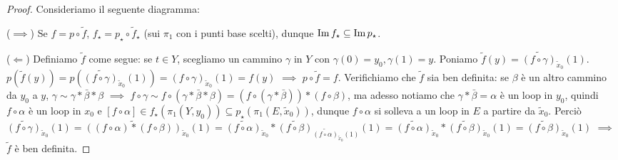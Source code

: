 \begin{proof}
  Consideriamo il seguente diagramma:
  \begin{center}
  \end{center}
  ($\implies$) Se $f=p \circ \tilde{f}$, $f_{\star}=p_{\star} \circ \tilde{f}_{\star}$ (sui $\pi_1$ con i punti base scelti), dunque $\operatorname{Im}{f_{\star}} \subseteq \operatorname{Im}{p_{\star}}$.

  ($\Leftarrow$) Definiamo $\tilde{f}$ come segue: se $t \in Y$, scegliamo un cammino $\gamma$ in $Y$ con $\gamma(0)=y_0, \gamma(1)=y$. Poniamo $\tilde{f}(y)=\widetilde{(f \circ \gamma)}_{\tilde{x}_0}(1)$.
  $p(\tilde{f}(y))=p(\widetilde{(f \circ \gamma)}_{\tilde{x}_0}(1))=(f \circ \gamma)_{\tilde{x}_0}(1)=f(y)$ $\implies$ $p \circ \tilde{f}=f$.
  Verifichiamo che $\tilde{f}$ sia ben definita: se $\beta$ è un altro cammino da $y_0$ a $y$, $\gamma \sim \gamma * \bar{\beta}*\beta$ $\implies$ $f \circ \gamma \sim f \circ (\gamma * \bar{\beta}*\beta)=(f \circ (\gamma * \bar{\beta}))*(f \circ \beta)$,
  ma adesso notiamo che $\gamma *\bar{\beta}=\alpha$ è un loop in $y_0$, quindi $f \circ \alpha$ è un loop in $x_0$ e $[f \circ \alpha] \in f_{\star}(\pi_1(Y, y_0)) \subseteq p_{\star}(\pi_1(E, \tilde{x}_0))$, dunque $f \circ \alpha$ si solleva a un loop in $E$ a partire da $\tilde{x}_0$.
  Perciò $\widetilde{(f \circ \gamma)}_{\tilde{x}_0}(1)=\widetilde{((f \circ \alpha)*(f \circ \beta))}_{\tilde{x}_0}(1)=\widetilde{(f \circ \alpha)}_{\tilde{x}_0}*\widetilde{(f \circ \beta)}_{\widetilde{(f \circ \alpha)}_{\tilde{x}_0}(1)}(1)=\widetilde{(f \circ \alpha)}_{\tilde{x}_0}*\widetilde{(f \circ \beta)}_{\tilde{x}_0}(1)=\widetilde{(f \circ \beta)}_{\tilde{x}_0}(1)$
  $\implies$ $\tilde{f}$ è ben definita.


\end{proof}
